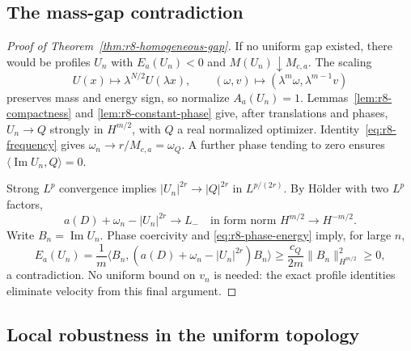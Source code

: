 \subsection{The mass-gap contradiction}

\begin{proof}[Proof of Theorem~\ref{thm:r8-homogeneous-gap}]
If no uniform gap existed, there would be profiles $U_n$ with
$E_a(U_n)<0$ and $M(U_n)\downarrow M_{c,a}$.
The scaling
\[
 U(x)\mapsto\lambda^{N/2}U(\lambda x),\qquad
 (\omega,v)\mapsto(\lambda^m\omega,\lambda^{m-1}v)
\]
preserves mass and energy sign, so normalize $A_a(U_n)=1$.
Lemmas~\ref{lem:r8-compactness} and \ref{lem:r8-constant-phase}
give, after translations and phases,
$U_n\to Q$ strongly in $H^{m/2}$, with $Q$ a real normalized
optimizer. Identity~\eqref{eq:r8-frequency} gives
$\omega_n\to r/M_{c,a}=\omega_Q$.
A further phase tending to zero ensures
$\langle\operatorname{Im}U_n,Q\rangle=0$.

Strong $L^p$ convergence implies
$|U_n|^{2r}\to|Q|^{2r}$ in $L^{p/(2r)}$.
By H\"older with two $L^p$ factors,
\[
 a(D)+\omega_n-|U_n|^{2r}\longrightarrow L_-
 \quad\text{in form norm }H^{m/2}\to H^{-m/2}.
\]
Write $B_n=\operatorname{Im}U_n$. Phase coercivity and
\eqref{eq:r8-phase-energy} imply, for large $n$,
\[
 E_a(U_n)
 =\frac1m\langle B_n,(a(D)+\omega_n-|U_n|^{2r})B_n\rangle
 \ge\frac{c_Q}{2m}\|B_n\|_{H^{m/2}}^2\ge0,
\]
a contradiction. No uniform bound on $v_n$ is needed: the exact
profile identities eliminate velocity from this final argument.
\end{proof}

\subsection{Local robustness in the uniform topology}

